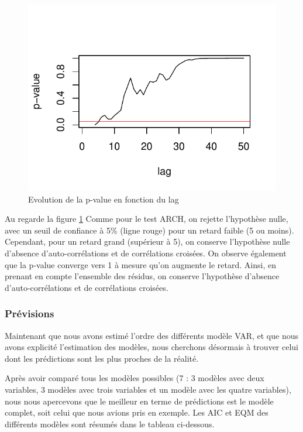 \documentclass[11pt,]{article}
\begin{document}
\begin{figure}[htbp]
\centering
\includegraphics{Rapport_final_files/figure-latex/unnamed-chunk-42-1.pdf}
\caption{\label{fig26} Evolution de la p-value en fonction du lag}
\end{figure}

Au regarde la figure \ref{fig26} Comme pour le test ARCH, on rejette
l'hypothèse nulle, avec un seuil de confiance à 5\% (ligne rouge) pour
un retard faible (5 ou moins). Cependant, pour un retard grand
(supérieur à 5), on conserve l'hypothèse nulle d'absence
d'auto-corrélations et de corrélations croisées. On observe également
que la p-value converge vers 1 à mesure qu'on augmente le retard. Ainsi,
en prenant en compte l'ensemble des résidus, on conserve l'hypothèse
d'absence d'auto-corrélations et de corrélations croisées.

\subsubsection{Prévisions}\label{previsions}

Maintenant que nous avons estimé l'ordre des différents modèle VAR, et
que nous avons explicité l'estimation des modèles, nous cherchons
désormais à trouver celui dont les prédictions sont les plus proches de
la réalité.

Après avoir comparé tous les modèles possibles (7 : 3 modèles avec deux
variables, 3 modèles avec trois variables et un modèle avec les quatre
variables), nous nous apercevons que le meilleur en terme de prédictions
est le modèle complet, soit celui que nous avions pris en exemple. Les
AIC et EQM des différents modèles sont résumés dans le tableau
ci-dessous.
\end{document}

